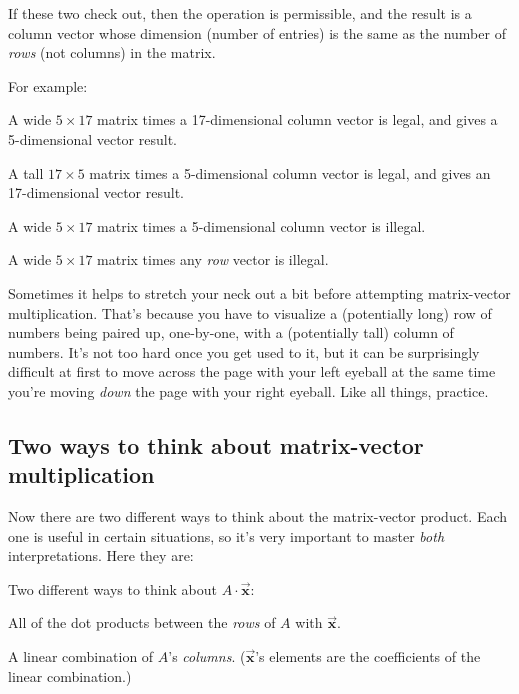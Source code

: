 If these two check out, then the operation is permissible, and the result is a
column vector whose dimension (number of entries) is the same as the number of
\textit{rows} (not columns) in the matrix.

For example:

\begin{compactitem}
\item A wide $5\times 17$ matrix times a 17-dimensional column vector is legal,
and gives a 5-dimensional vector result.
\item A tall $17\times 5$ matrix times a 5-dimensional column vector is legal,
and gives an 17-dimensional vector result.
\item A wide $5\times 17$ matrix times a 5-dimensional column vector is
illegal.
\item A wide $5\times 17$ matrix times any \textit{row} vector is illegal.
\end{compactitem}

\medskip

Sometimes it helps to stretch your neck out a bit before attempting
matrix-vector multiplication. That's because you have to visualize a
(potentially long) row of numbers being paired up, one-by-one, with a
(potentially tall) column of numbers. It's not too hard once you get used to
it, but it can be surprisingly difficult at first to move across the page with
your left eyeball at the same time you're moving \textit{down} the page with
your right eyeball. Like all things, practice.


\subsection{Two ways to think about matrix-vector multiplication}

Now there are two different ways to think about the matrix-vector product. Each
one is useful in certain situations, so it's very important to master
\textit{both} interpretations. Here they are:

\begin{framed}
\label{twoInterpretations}
\begin{samepage}
Two different ways to think about $A \cdot \overrightarrow{\textbf{x}}$:
\begin{compactenum}
\item All of the dot products between the \textit{rows} of $A$ with
$\overrightarrow{\textbf{x}}$.
\item A linear combination of $A$'s \textit{columns}.
($\overrightarrow{\textbf{x}}$'s elements are the coefficients of the
linear combination.)
\end{compactenum}
\end{samepage}
\end{framed}

